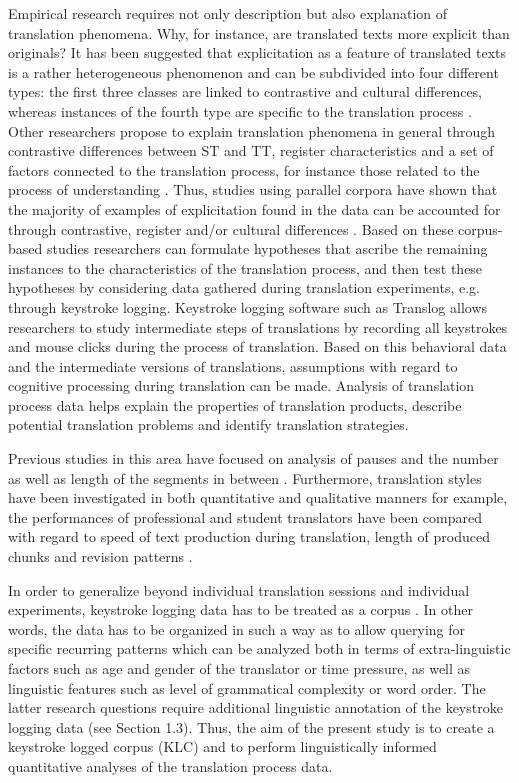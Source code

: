 \documentclass[output=paper]{LSP/langsci}
\begin{document}
Empirical research requires not only description but also explanation of translation phenomena. Why, for instance, are translated texts more explicit than originals? It has been suggested that explicitation as a feature of translated texts is a rather heterogeneous phenomenon and can be subdivided into four different types: the first three classes are linked to contrastive and cultural differences, whereas instances of the fourth type are specific to the translation process \citep[82-83]{Klaudy1998}. Other researchers propose to explain translation phenomena in general through contrastive differences between ST and TT, register characteristics and a set of factors connected to the translation process, for instance those related to the process of understanding \citep{Steiner2001}. Thus, studies using parallel corpora have shown that the majority of examples of explicitation found in the data can be accounted for through contrastive, register and/or cultural differences \citep{Hansen-Schirra2007,Becher2010}. Based on these corpus-based studies researchers can formulate hypotheses that ascribe the remaining instances to the characteristics of the translation process, and then test these hypotheses by considering data gathered during translation experiments, e.g. through keystroke logging. Keystroke logging software such as Translog \citep{Jakobsen1999} allows researchers to study intermediate steps of translations by recording all keystrokes and mouse clicks during the process of translation. Based on this behavioral data and the intermediate versions of translations, assumptions with regard to cognitive processing during translation can be made. Analysis of translation process data helps explain the properties of translation products, describe potential translation problems and identify translation strategies.

Previous studies in this area have focused on analysis of pauses and the number as well as length of the segments in between \citep[e.g.][]{Dragsted2005,Jakobsen2005,Alves2009,Alves2011}. Furthermore, translation styles have been investigated in both quantitative and qualitative manners \citep[e.g.][]{Pagano2008, CarlandDragsted2011} for example, the performances of professional and student translators have been compared with regard to speed of text production during translation, length of produced chunks and revision patterns \citep[e.g.][]{Jakobsen2005}.
 
In order to generalize beyond individual translation sessions and individual experiments, keystroke logging data has to be treated as a corpus \citep{Alves2004, Alves2009, Alves2011}. In other words, the data has to be organized in such a way as to allow querying for specific recurring patterns \citep{Carl2009} which can be analyzed both in terms of extra-linguistic factors such as age and gender of the translator or time pressure, as well as linguistic features such as level of grammatical complexity or word order. The latter research questions require additional linguistic annotation of the keystroke logging data (see Section 1.3). Thus, the aim of the present study is to create a keystroke logged corpus (KLC) and to perform linguistically informed quantitative analyses of the translation process data.
\end{document}
